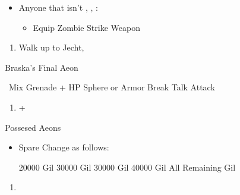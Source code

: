 \begin{multicols}{2}
	\begin{equip}
		\begin{itemize}
			\item Anyone that isn't \tidus, \yuna, \auron:
			      \begin{itemize}
				      \item Equip Zombie Strike Weapon
			      \end{itemize}
		\end{itemize}
	\end{equip}
	\begin{enumerate}[resume]
		\item Walk up to Jecht, \cs[4:30]
	\end{enumerate}
	\vfill
	\begin{battle}[180000]{Braska's Final Aeon}
		\begin{itemize}
			\switch{\yuna}{\rikku}
			\rikkuf \od\ Mix Grenade + HP Sphere or Armor Break
			\tidusf Talk
			\switch{\auron}{\yuna}
			\summon{\bahamut}
			\bahamutf Attack
		\end{itemize}
	\end{battle}
\end{multicols}
\begin{enumerate}[resume]
	\item \cs+\skippablefmv[4:00]
\end{enumerate}
\begin{battle}{Possesed Aeons}
	\begin{itemize}
		\item Spare Change as follows:
		      \begin{itemize}
			      \valeforf \num{20000} Gil
			      \ifritf \num{30000} Gil
			      \ixilonf \num{30000} Gil
			      \bahamutf \num{40000} Gil
			      \shivaf All Remaining Gil
		      \end{itemize}
	\end{itemize}
\end{battle}
\begin{enumerate}[resume]
	\item \cs[1:40]
\end{enumerate}
